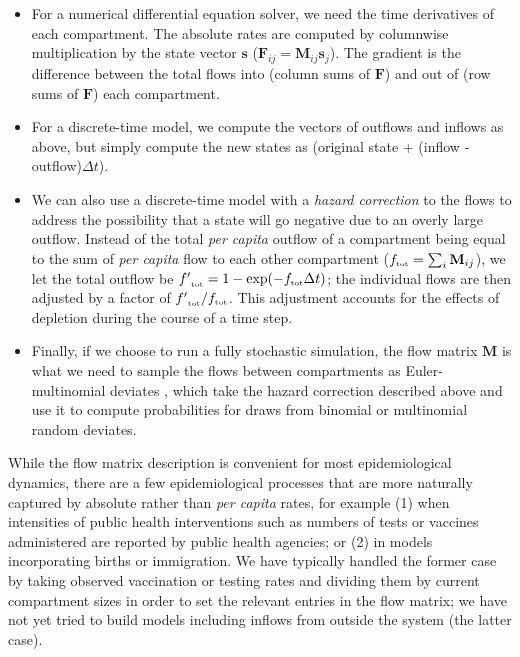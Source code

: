\documentclass[12pt]{article}\usepackage[]{graphicx}\usepackage[]{color}
\begin{document}
\begin{itemize}
\item For a numerical differential equation solver, we need the time derivatives of each compartment. The absolute rates are computed by columnwise multiplication by the state vector $\mathbf s$ (${\mathbf F}_{ij} = \mathbf{M}_{ij} \mathbf{s}_j$).
The gradient is the difference between the total flows into (column sums of $\mathbf F$) and out of (row sums of $\mathbf F$) each compartment.
\item For a discrete-time model, we compute the vectors of outflows and inflows as above, but simply compute the new states as (original state + (inflow - outflow)$\Delta t$).
\item We can also use a discrete-time model with a \emph{hazard correction} 
  to the flows to address the possibility that a state will go negative due to an overly large outflow. Instead of the total \emph{per capita} outflow of a compartment being equal to the sum of \emph{per capita} flow to each other compartment (${{f}_{\textrm{\tiny tot}}} = \sum_i {\mathbf M}_{ij}$), we let the total outflow be ${{f'}_{\textrm{\tiny tot}}} = 1-\exp(-{{f}_{\textrm{\tiny tot}}} \Delta t)$; the individual flows are then adjusted by a factor of ${{f'}_{\textrm{\tiny tot}}}/{{f}_{\textrm{\tiny tot}}}$.  
This adjustment accounts for the effects of depletion during the course of a time step.
\item Finally, if we choose to run a fully stochastic simulation, the flow matrix $\mathbf M$ is what we need to sample the flows between compartments as Euler-multinomial deviates \cite{breto+09}, which take the hazard correction described above and use it to compute probabilities for draws from binomial or multinomial random deviates.
\end{itemize}

While the flow matrix description is convenient for most epidemiological dynamics, there are a few epidemiological processes that are more naturally captured by absolute rather than \emph{per capita} rates, for example (1) when intensities of public health interventions such as numbers of tests or vaccines administered are reported by public health agencies; or (2) in models incorporating births or immigration.
We have typically handled the former case by taking observed vaccination or testing rates and dividing them by current compartment sizes in order to set the relevant entries in the flow matrix; we have not yet tried to build models including inflows from outside the system (the latter case).
\end{document}
